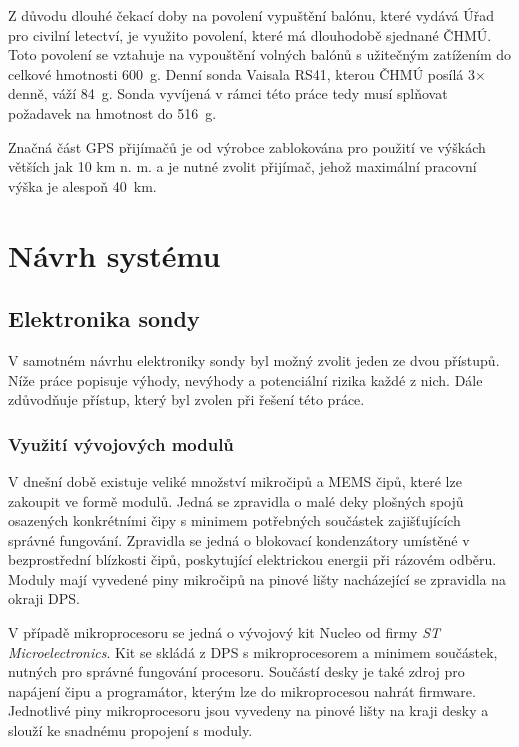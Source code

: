 \documentclass[twoside]{ctuthesis}
\theoremstyle{plain}
\theoremstyle{definition}
\theoremstyle{note}
\begin{document}
	Z důvodu dlouhé čekací doby na povolení vypuštění balónu, které vydává Úřad pro civilní letectví, je využito povolení, které má dlouhodobě sjednané ČHMÚ. Toto povolení se vztahuje na vypouštění volných balónů s užitečným zatížením do celkové hmotnosti 600~g. Denní sonda Vaisala RS41, kterou ČHMÚ posílá 3$\times$ denně, váží 84~g. Sonda vyvíjená v rámci této práce tedy musí splňovat požadavek na hmotnost do 516~g.

	Značná část GPS přijímačů je od výrobce zablokována pro použití ve výškách větších jak 10 km n. m. a je nutné zvolit přijímač, jehož maximální pracovní výška je alespoň 40~km.


	\section{Návrh systému}
		\subsection{Elektronika sondy}

		V samotném návrhu elektroniky sondy byl možný zvolit jeden ze dvou přístupů. Níže práce popisuje výhody, nevýhody a potenciální rizika každé z nich. Dále zdůvodňuje přístup, který byl zvolen při řešení této práce.

			\subsubsection{Využití vývojových modulů}
			V dnešní době existuje veliké množství mikročipů a MEMS čipů, které lze zakoupit ve formě modulů. Jedná se zpravidla o malé deky plošných spojů osazených konkrétními čipy s minimem potřebných součástek zajišťujících správné fungování. Zpravidla se jedná o blokovací kondenzátory umístěné v bezprostřední blízkosti čipů, poskytující elektrickou energii při rázovém odběru. Moduly mají vyvedené piny mikročipů na pinové lišty nacházející se zpravidla na okraji DPS. 

			V případě mikroprocesoru se jedná o vývojový kit Nucleo od firmy \textit{ST Microelectronics}. Kit se skládá z DPS s mikroprocesorem a minimem součástek, nutných pro správné fungování procesoru. Součástí desky je také zdroj pro napájení čipu a programátor, kterým lze do mikroprocesou nahrát firmware. Jednotlivé piny mikroprocesoru jsou vyvedeny na pinové lišty na kraji desky a slouží ke snadnému propojení s moduly. 
\end{document}
